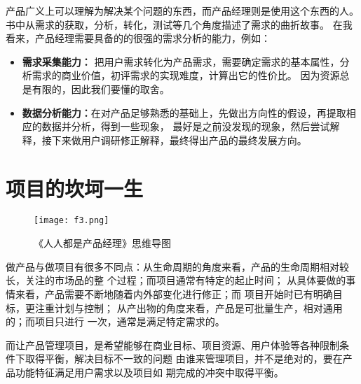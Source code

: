 \documentclass[lang=cn,11pt,numbers]{elegantpaper}
\begin{document}
产品广义上可以理解为解决某个问题的东西，而产品经理则是使用这个东西的人。书中从需求的获取，分析，转化，测试等几个角度描述了需求的曲折故事。
在我看来，产品经理需要具备的的很强的需求分析的能力，例如：
\begin{itemize}
\item \textbf{需求采集能力：} 把用户需求转化为产品需求，需要确定需求的基本属性，分析需求的商业价值，初评需求的实现难度，计算出它的性价比。
因为资源总是有限的，因此我们要懂的取舍。
\item \textbf{数据分析能力：}在对产品足够熟悉的基础上，先做出方向性的假设，再提取相应的数据并分析，得到一些现象， 最好是之前没发现的现象，然后尝试解释，接下来做用户调研修正解释，最终得出产品的最终发展方向。
\end{itemize}

\section{项目的坎坷一生}

\begin{figure}[H]
	\centering
	\texttt{[image: f3.png]}
	\caption{ 《人人都是产品经理》思维导图 \label{fig:4}}
\end{figure}

做产品与做项目有很多不同点：从生命周期的角度来看，产品的生命周期相对较长，关注的市场品的整
个过程；而项目通常有特定的起止时间；
从具体要做的事情来看，产品需要不断地随着内外部变化进行修正；而
项目开始时已有明确目标，更注重计划与控制；
从产出物的角度来看，产品是可批量生产，相对通用的；而项目只进行
一次，通常是满足特定需求的。

而让产品管理项目，是希望能够在商业目标、项目资源、用户体验等各种限制条
件下取得平衡，解决目标不一致的问题
由谁来管理项目，并不是绝对的，要在产品功能特征满足用户需求以及项目如
期完成的冲突中取得平衡。


\nocite{*}

\end{document}
